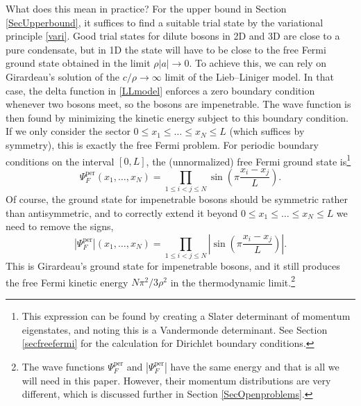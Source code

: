 \documentclass[a4paper,11pt]{article}
\newcommand{\abs}[1]{\left\lvert #1 \right\rvert}
\numberwithin{equation}{section}
\begin{document}
	What does this mean in practice? For the upper bound in Section \ref{SecUpperbound}, it suffices to find a suitable trial state by the variational principle \eqref{vari}. Good trial states for dilute bosons in 2D and 3D are close to a pure condensate, but in 1D the state will have to be close to the free Fermi ground state obtained in the limit $\rho|a|\to0$. To achieve this, we can rely on Girardeau's solution \cite{girardeau1960relationship} of the $c/\rho\to\infty$ limit of the Lieb--Liniger model. In that case, the delta function in \eqref{LLmodel} enforces a zero boundary condition whenever two bosons meet, so the bosons are impenetrable. The wave function is then found by minimizing the kinetic energy subject to this boundary condition. If we only consider the sector $0\leq x_1\leq\dots\leq x_N\leq L$ (which suffices by symmetry), this is exactly the free Fermi problem. For periodic boundary conditions on the interval $[0,L]$, the (unnormalized) free Fermi ground state is\footnote{This expression can be found by creating a Slater determinant of momentum eigenstates, and noting this is a Vandermonde determinant. See Section \ref{secfreefermi} for the calculation for Dirichlet boundary conditions.}
	\begin{equation}
		\label{fermisolution}
		\Psi^{\text{per}}_F(x_1,\dots,x_N)=\prod_{1\leq i<j\leq N}\sin\left(\pi\frac{x_i-x_j}{L}\right).
	\end{equation}
	Of course, the ground state for impenetrable bosons should be symmetric rather than antisymmetric, and to correctly extend it beyond $0\leq x_1\leq\dots\leq x_N\leq L$ we need to remove the signs,
	\begin{equation}
		\label{girardeausolution}
		\abs{\Psi^{\text{per}}_F}(x_1,\dots,x_N)=\prod_{1\leq i<j\leq N}\abs{\sin\left(\pi\frac{x_i-x_j}{L}\right)}.
	\end{equation}
	This is Girardeau's ground state for impenetrable bosons, and it still produces the free Fermi kinetic energy $N\pi^2/3\rho^2$ in the thermodynamic limit.\footnote{The wave functions $\Psi^{\text{per}}_F$ and $|\Psi^{\text{per}}_F|$ have the same energy and that is all we will need in this paper. However, their momentum distributions are very different, which is discussed further in Section \ref{SecOpenproblems}.\label{momremark}} 
	
\end{document}
